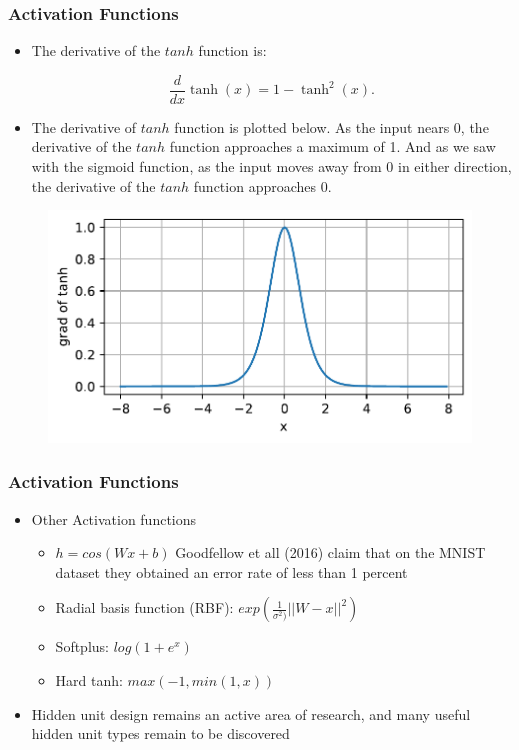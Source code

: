 \documentclass[
  shownotes,
  xcolor={svgnames},
  hyperref={colorlinks,citecolor=DarkBlue,linkcolor=DarkRed,urlcolor=DarkBlue}
  , aspectratio=169]{beamer}
\begin{document}
\begin{frame}
\frametitle{Activation Functions}

\begin{itemize}
\item The derivative of the $tanh$ function is:

$$\frac{d}{dx} \operatorname{tanh}(x) = 1 - \operatorname{tanh}^2(x).$$

\item The derivative of $tanh$ function is plotted below. As the input nears 0, the derivative of the $tanh$ function approaches a maximum of 1. And as we saw with the sigmoid function, as the input moves away from 0 in either direction, the derivative of the $tanh$ function approaches 0.
\end{itemize}


  \begin{figure}[H] \centering
            \captionsetup{justification=centering}
              \includegraphics[scale=0.45]{figures/tanh_dev}
              
 \end{figure}



\end{frame}
\begin{frame}
\frametitle{Activation Functions}


\begin{itemize}
\item Other Activation functions
\medskip
\begin{itemize}
\item $h=cos(W x+b)$ Goodfellow et all (2016) claim that on the MNIST dataset they obtained an error rate of less than 1 percent
\medskip
\item Radial basis function (RBF): $exp\left( \frac{1}{\sigma^2)}||W-x||^2 \right)$
\medskip
\item Softplus: $log(1+e^x)$
\medskip
\item Hard tanh: $max(-1,min(1,x))$
\medskip
\end{itemize}
\item Hidden unit design remains an active area of research, and many useful hidden unit types remain to be discovered
\end{itemize}


\end{frame}
\end{document}
